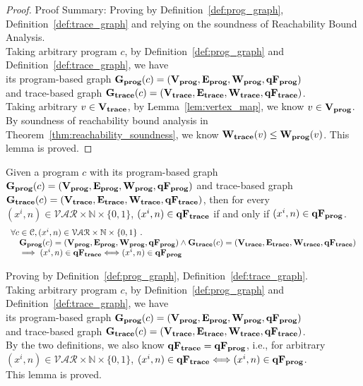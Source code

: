 \begin{proof}
Proof Summary: Proving by Definition~\ref{def:prog_graph}, Definition~\ref{def:trace_graph} and relying on the soundness of Reachability Bound 
Analysis.
\\
Taking arbitrary program $c$,
by Definition~\ref{def:prog_graph} and Definition~\ref{def:trace_graph}, 
we have   
\\
its program-based graph $\mathtt{\bf{G_{prog}}}({c}) = (\mathtt{\bf{V_{prog}}}, \mathtt{\bf{E_{prog}}}, \mathtt{\bf{W_{prog}}}, \mathtt{\bf{qF_{prog}}})$ 
\\
and 
trace-based graph $\mathtt{\bf{G_{trace}}}({c}) = (\mathtt{\bf{V_{trace}}}, \mathtt{\bf{E_{trace}}}, \mathtt{\bf{W_{trace}}}, \mathtt{\bf{qF_{trace}}})$.
\\
Taking arbitrary $v \in \mathtt{\bf{V_{trace}}}$, by Lemma~\ref{lem:vertex_map}, we know $v \in \mathtt{\bf{V_{prog}}}$.
\\
By soundness of reachability bound analysis in Theorem~\ref{thm:reachability_soundness}, we know $\mathtt{\bf{W_{trace}}}(v) \leq \mathtt{\bf{W_{prog}}}(v)$. This lemma is proved.
\end{proof}
%
\begin{lem}
	\label{lem:queryvertex_map}
	Given a program $c$ with its
	program-based graph $\mathtt{\bf{G_{prog}}}({c}) = (\mathtt{\bf{V_{prog}}}, \mathtt{\bf{E_{prog}}}, \mathtt{\bf{W_{prog}}}, \mathtt{\bf{qF_{prog}}})$
	and 
	trace-based graph $\mathtt{\bf{G_{trace}}}({c}) = (\mathtt{\bf{V_{trace}}}, \mathtt{\bf{E_{trace}}}, \mathtt{\bf{W_{trace}}}, \mathtt{\bf{qF_{trace}}})$,
	then for every $(x^i, n) \in \mathcal{VAR} \times \mathbb{N}  \times \{0, 1\} $,
	 $(x^i, n) \in \mathtt{\bf{qF_{trace}}}$ if and only if $ (x^i, n) \in \mathtt{\bf{qF_{prog}}}$.
	\[
	\begin{array}{l}
	\forall c \in \mathcal{C} , (x^i, n) \in \mathcal{VAR} \times \mathbb{N}  \times \{0, 1\} 
	 ~.~ 
	 \\ \quad
	 \mathtt{\bf{G_{prog}}}({c}) = (\mathtt{\bf{V_{prog}}}, \mathtt{\bf{E_{prog}}}, \mathtt{\bf{W_{prog}}}, \mathtt{\bf{qF_{prog}}})
	\land 
	\mathtt{\bf{G_{trace}}}({c}) = (\mathtt{\bf{V_{trace}}}, \mathtt{\bf{E_{trace}}}, \mathtt{\bf{W_{trace}}}, \mathtt{\bf{qF_{trace}}})
	\\ \quad
	\implies
	(x^i, n) \in \mathtt{\bf{qF_{trace}}} \Longleftrightarrow  (x^i, n) \in \mathtt{\bf{qF_{prog}}}
	\end{array}
	\]
	\end{lem}
\begin{subproof}
Proving by Definition~\ref{def:prog_graph}, Definition~\ref{def:trace_graph}.
\\
Taking arbitrary program $c$,
by Definition~\ref{def:prog_graph} and Definition~\ref{def:trace_graph}, 
we have   
\\
its program-based graph $\mathtt{\bf{G_{prog}}}({c}) = (\mathtt{\bf{V_{prog}}}, \mathtt{\bf{E_{prog}}}, \mathtt{\bf{W_{prog}}}, \mathtt{\bf{qF_{prog}}})$ 
\\
and 
trace-based graph $\mathtt{\bf{G_{trace}}}({c}) = (\mathtt{\bf{V_{trace}}}, \mathtt{\bf{E_{trace}}}, \mathtt{\bf{W_{trace}}}, \mathtt{\bf{qF_{trace}}})$.
\\
By the two definitions, we also know $\mathtt{\bf{qF_{trace}}}  = \mathtt{\bf{qF_{prog}}}$, 
i.e., 
for arbitrary $ (x^i, n) \in \mathcal{VAR} \times \mathbb{N}  \times \{0, 1\} $,
 $(x^i, n) \in \mathtt{\bf{qF_{trace}}} \Longleftrightarrow  (x^i, n) \in \mathtt{\bf{qF_{prog}}}$.
 \\
 This lemma is proved.
\end{subproof}

